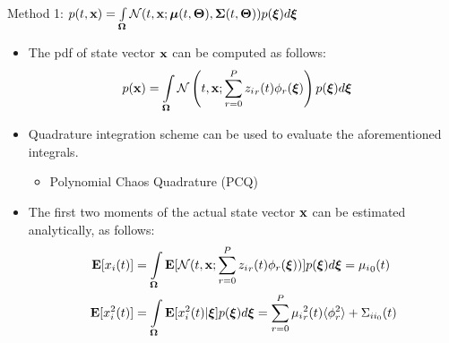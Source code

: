 \documentclass{beamer}
\begin{document}
\begin{frame}\frametitle{\color{black}{Proposed Approach}}\framesubtitle{\color{white}{$\dot{\x} = \A(\Th)\x + \B(\Th)\u+ \G(\Th)\et$}}

\begin{block}{Method 1: $p(t,\mathbf{x})=\int\limits_{\boldsymbol{\Omega}}\mathcal{N}(t,\mathbf{x};\boldsymbol{\mu}(t,\boldsymbol{\Theta}),\boldsymbol{\Sigma}(t,\boldsymbol{\Theta}))p(\boldsymbol{\xi})d\boldsymbol{\xi} $}
\begin{itemize}
\item The pdf of state vector $\mathbf{x}$ can be computed as follows:\vspace{-0.15in}
\small{\begin{align}
p(\mathbf{x})&=\int\limits_{\boldsymbol{\Omega}}\mathcal{N}\left(t,\mathbf{x};\sum_{r=0}^P {z_i}_r(t)\phi_r(\boldsymbol{\xi})\right)p(\boldsymbol{\xi})d\boldsymbol{\xi} \label{pdfeq1}
\end{align}}\vspace{-0.2in}
\item \alert{Quadrature integration} scheme can be used to evaluate the aforementioned integrals.
\begin{itemize}
\item Polynomial Chaos Quadrature (PCQ) {\color{blue}{[Dalbey et al., 2008]}}
\end{itemize}
\item<2-> The first two moments of the actual state vector $\mathbf{x}$ can be estimated analytically, as follows:\vspace{-0.2in}
\small{\begin{align}
\Ex{x_i(t)} &= \int\limits_{\om}{\Ex{\mathcal{N}(t,\x;\sum_{r=0}^P {z_i}_r(t)\phi_r(\xib))} p(\xib)d\xib}= {\mu_i}_0(t)\\
\Ex{x_i^2(t)} &= \int\limits_{\om}{\Ex{x_i^2(t)|\xib} p(\xib)d\xib}= \sum_{r=0}^P {\mu_i}_r^2(t)\langle\phi_r^2\rangle + \Sigma_{ii_0}(t)\vspace{-0.1in}
\end{align}}\vspace{-0.1in}
\end{itemize}
\end{block}
\end{frame}
\end{document}

